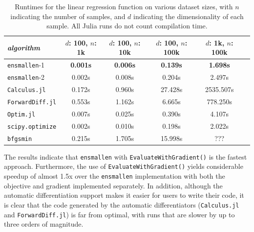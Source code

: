 \documentclass{article}
\begin{document}
\begin{table}
\centering
\begin{adjustbox}{scale={0.90}{0.90}}
\begin{tabular}{lccccc}
\toprule
{\em algorithm} & $d$: 100, $n$: 1k & $d$: 100, $n$: 10k & $d$: 100, $n$:
100k & $d$: 1k, $n$: 100k \\
\midrule
{\tt ensmallen}-1 & {\bf 0.001s} & {\bf 0.006s} & {\bf 0.139s} & {\bf 1.698s} \\
{\tt ensmallen}-2 & 0.002s & 0.008s & 0.204s & 2.497s \\
{\tt Calculus.jl} & 0.172s & 0.960s & 27.428s & 2535.507s \\
{\tt ForwardDiff.jl} & 0.553s & 1.162s & 6.665s & 778.250s \\
{\tt Optim.jl} & 0.007s & 0.025s & 0.390s & 4.107s \\
{\tt scipy.optimize} & 0.002s & 0.010s & 0.198s & 2.022s \\
{\tt bfgsmin} & 0.215s & 1.705s & 15.998s & ??? \\
\bottomrule
\end{tabular}
\end{adjustbox}
\vspace*{0.25ex}
\caption{\footnotesize
Runtimes for the linear regression function on various dataset sizes,
with $n$ indicating the number of samples,
and $d$ indicating the dimensionality of each sample.
All Julia runs do not count compilation time.}
\label{tab:lbfgs}
\vspace*{-1ex}
\end{table}

The results indicate that {\tt ensmallen} with \texttt{\small EvaluateWithGradient()}
is the fastest approach.
Furthermore, the use of \texttt{\small EvaluateWithGradient()} yields considerable
speedup of almost 1.5x over the {\tt ensmallen} implementation with both the
objective and gradient implemented separately.  In addition, although the
automatic differentiation support makes it easier for users to write their
code, it is clear that the code generated by the automatic differentiators
({\tt Calculus.jl} and {\tt ForwardDiff.jl})
is far from optimal, with runs that are slower by up to three orders of magnitude.

%
\end{document}
